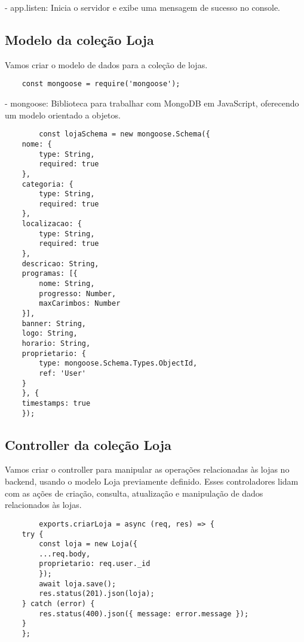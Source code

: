 - app.listen: Inicia o servidor e exibe uma mensagem de sucesso no console.

\subsection{Modelo da coleção Loja}

Vamos criar o modelo de dados para a coleção de lojas.

\vspace{1cm}
\begin{lstlisting}
    const mongoose = require('mongoose');
\end{lstlisting}  
\vspace{1cm}

- mongoose: Biblioteca para trabalhar com MongoDB em JavaScript, oferecendo um modelo orientado a objetos.

\vspace{1cm}
\begin{lstlisting}
        const lojaSchema = new mongoose.Schema({
    nome: {
        type: String,
        required: true
    },
    categoria: {
        type: String,
        required: true
    },
    localizacao: {
        type: String,
        required: true
    },
    descricao: String,
    programas: [{
        nome: String,
        progresso: Number,
        maxCarimbos: Number
    }],
    banner: String,
    logo: String,
    horario: String,
    proprietario: {
        type: mongoose.Schema.Types.ObjectId,
        ref: 'User'
    }
    }, {
    timestamps: true
    });
\end{lstlisting}  
\vspace{1cm}

\subsection{Controller da coleção Loja}

Vamos criar o controller para manipular as operações relacionadas às lojas no backend, 
usando o modelo Loja previamente definido. Esses controladores lidam com as ações de criação, 
consulta, atualização e manipulação de dados relacionados às lojas.

\vspace{1cm}
\begin{lstlisting}
        exports.criarLoja = async (req, res) => {
    try {
        const loja = new Loja({
        ...req.body,
        proprietario: req.user._id
        });
        await loja.save();
        res.status(201).json(loja);
    } catch (error) {
        res.status(400).json({ message: error.message });
    }
    };
\end{lstlisting}
\vspace{1cm}

